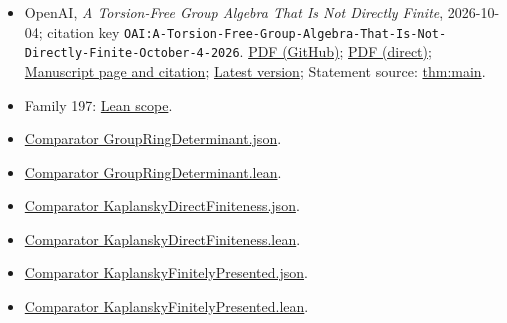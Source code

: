 \documentclass[11pt]{article}
\begin{document}
\begin{itemize}
\item OpenAI, \emph{A Torsion-Free Group Algebra That Is Not Directly Finite}, 2026-10-04; citation key \texttt{OAI:A-Torsion-Free-Group-Algebra-That-Is-Not-Directly-Finite-October-4-2026}. \href{https://github.com/openai/math/blob/adc7f1241b42e322a6451854ab7e4b4c146bf78a/preprints/A-Torsion-Free-Group-Algebra-That-Is-Not-Directly-Finite-October-4-2026/direct-finiteness.pdf}{PDF (GitHub)}; \href{https://github.com/openai/math/raw/adc7f1241b42e322a6451854ab7e4b4c146bf78a/preprints/A-Torsion-Free-Group-Algebra-That-Is-Not-Directly-Finite-October-4-2026/direct-finiteness.pdf}{PDF (direct)}; \href{https://github.com/openai/math/blob/adc7f1241b42e322a6451854ab7e4b4c146bf78a/preprints/A-Torsion-Free-Group-Algebra-That-Is-Not-Directly-Finite-October-4-2026/README.md}{Manuscript page and citation}; \href{https://github.com/openai/math/blob/main/preprints/A-Torsion-Free-Group-Algebra-That-Is-Not-Directly-Finite-October-4-2026/direct-finiteness.pdf}{Latest version}; Statement source: \href{https://github.com/openai/math/blob/adc7f1241b42e322a6451854ab7e4b4c146bf78a/preprints/A-Torsion-Free-Group-Algebra-That-Is-Not-Directly-Finite-October-4-2026/build/sections/introduction.tex\#L13}{thm:main}.
\item Family 197: \href{https://github.com/openai/math/blob/adc7f1241b42e322a6451854ab7e4b4c146bf78a/lean/docs/197.md}{Lean scope}.
\item \href{https://github.com/openai/math/blob/adc7f1241b42e322a6451854ab7e4b4c146bf78a/lean/ComparatorChallenges/GroupRingDeterminant.json}{Comparator GroupRingDeterminant.json}.
\item \href{https://github.com/openai/math/blob/adc7f1241b42e322a6451854ab7e4b4c146bf78a/lean/ComparatorChallenges/GroupRingDeterminant.lean}{Comparator GroupRingDeterminant.lean}.
\item \href{https://github.com/openai/math/blob/adc7f1241b42e322a6451854ab7e4b4c146bf78a/lean/ComparatorChallenges/KaplanskyDirectFiniteness.json}{Comparator KaplanskyDirectFiniteness.json}.
\item \href{https://github.com/openai/math/blob/adc7f1241b42e322a6451854ab7e4b4c146bf78a/lean/ComparatorChallenges/KaplanskyDirectFiniteness.lean}{Comparator KaplanskyDirectFiniteness.lean}.
\item \href{https://github.com/openai/math/blob/adc7f1241b42e322a6451854ab7e4b4c146bf78a/lean/ComparatorChallenges/KaplanskyFinitelyPresented.json}{Comparator KaplanskyFinitelyPresented.json}.
\item \href{https://github.com/openai/math/blob/adc7f1241b42e322a6451854ab7e4b4c146bf78a/lean/ComparatorChallenges/KaplanskyFinitelyPresented.lean}{Comparator KaplanskyFinitelyPresented.lean}.

\end{itemize}
\end{document}
